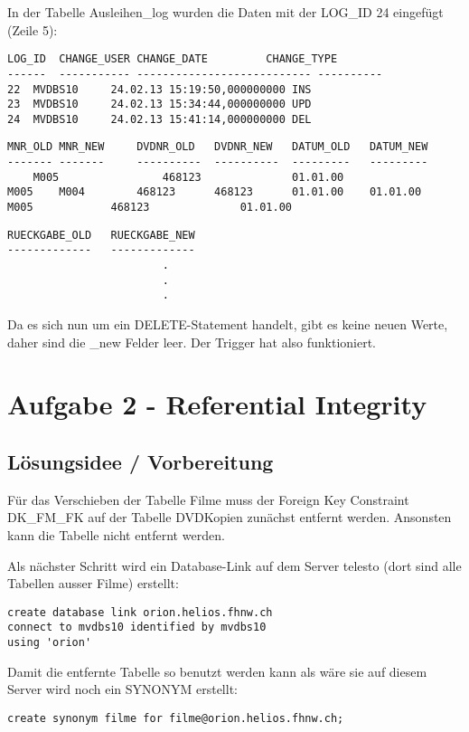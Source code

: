 \documentclass[11pt,a4paper,parskip=half]{scrartcl}
\begin{document}
In der Tabelle Ausleihen\_log wurden die Daten mit der LOG\_ID 24 eingefügt (Zeile 5):
\begin{lstlisting}
LOG_ID	CHANGE_USER	CHANGE_DATE			CHANGE_TYPE	
------	-----------	---------------------------	----------		
22	MVDBS10		24.02.13 15:19:50,000000000	INS					
23	MVDBS10		24.02.13 15:34:44,000000000	UPD					
24	MVDBS10		24.02.13 15:41:14,000000000	DEL					
\end{lstlisting}

\begin{lstlisting}
MNR_OLD	MNR_NEW		DVDNR_OLD	DVDNR_NEW	DATUM_OLD	DATUM_NEW	
-------	-------		----------	----------	---------	--------- 	
	M005				468123				01.01.00					
M005	M004		468123		468123		01.01.00	01.01.00				
M005			468123				01.01.00					
\end{lstlisting}
\begin{lstlisting}
RUECKGABE_OLD	RUECKGABE_NEW
-------------	-------------	
						.
						.
						.
\end{lstlisting}

Da es sich nun um ein DELETE-Statement handelt, gibt es keine neuen Werte, daher sind die \_new Felder leer. Der Trigger hat also funktioniert.

\section{Aufgabe 2 - Referential Integrity}
\subsection{Lösungsidee / Vorbereitung}
Für das Verschieben der Tabelle \glqq{}Filme\grqq{} muss der Foreign Key Constraint \glqq{}DK\_FM\_FK\grqq{} auf der Tabelle \glqq{}DVDKopien\grqq{} zunächst entfernt werden. Ansonsten kann die Tabelle nicht entfernt werden.

Als nächster Schritt wird ein Database-Link auf dem Server telesto (dort sind alle Tabellen ausser Filme) erstellt:

\begin{lstlisting}
create database link orion.helios.fhnw.ch
connect to mvdbs10 identified by mvdbs10
using 'orion'
\end{lstlisting}

Damit die entfernte Tabelle so benutzt werden kann als wäre sie auf diesem Server wird noch ein SYNONYM erstellt:
\begin{lstlisting}
create synonym filme for filme@orion.helios.fhnw.ch;
\end{lstlisting}
\end{document}
